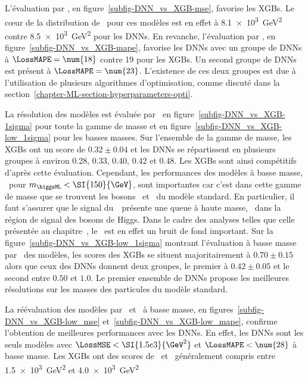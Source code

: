 L'évaluation par \LossMSE, en figure~\ref{subfig-DNN_vs_XGB-mse}, favorise les XGBs.
Le cœur de la distribution de \LossMSE\ pour ces modèles est en effet à \SI{8.1e3}{\GeV^2}
contre \SI{8.5e3}{\GeV^2} pour les DNNs.
En revanche,
l'évaluation par \LossMAPE, en figure~\ref{subfig-DNN_vs_XGB-mape}, favorise les DNNs
avec un groupe de DNNs à $\LossMAPE=\num{18}$
contre \num{19} pour les XGBs.
Un second groupe de DNNs est présent à $\LossMAPE=\num{23}$.
L'existence de ces deux groupes est due à l'utilisation de plusieurs algorithmes d'optimisation, comme discuté dans la section~\ref{chapter-ML-section-hyperparameters-opti}.
\par
La résolution des modèles est évaluée par \OneSigmaWidth\
en figure~\ref{subfig-DNN_vs_XGB-1sigma} pour toute la gamme de masse
et
en figure~\ref{subfig-DNN_vs_XGB-low_1sigma} pour les basses masses.
Sur l'ensemble de la gamme de masse,
les XGBs ont un score de $\num{0.32}\pm\num{0.04}$
et
les DNNs se répartissent en plusieurs groupes
à environ
\num{0.28}, \num{0.33}, \num{0.40}, \num{0.42} et \num{0.48}.
Les XGBs sont ainsi compétitifs d'après cette évaluation.
Cependant,
les performances des modèles
à basse masse, \ie\ pour $m_{\higgsML} < \SI{150}{\GeV}$,
sont importantes car c'est dans cette gamme de masse que se trouvent les bosons \Zboson\ et \higgs\ du modèle standard.
En particulier, il faut s'assurer que le signal du~\Zboson\ présente une queue à haute masse, \ie\ dans la région de signal des bosons de Higgs.
Dans le cadre des analyses telles que celle présentée au chapitre~\refChHTT, le \Zboson\ est en effet un bruit de fond important.
Sur la figure~\ref{subfig-DNN_vs_XGB-low_1sigma}
montrant l'évaluation à basse masse par \OneSigmaWidth\ des modèles,
les scores des XGBs se situent majoritairement à $\num{0.70}\pm\num{0.15}$
alors que ceux des DNNs donnent deux groupes,
le premier à $\num{0.42}\pm\num{0.05}$
et
le second entre $\num{0.50}$ et $\num{1.0}$.
Le premier ensemble de DNNs propose les meilleures résolutions sur les masses des particules du modèle standard.
\par
La réévaluation des modèles par 
\LossMSE\ et \LossMAPE\ à basse masse, en figures~\ref{subfig-DNN_vs_XGB-low_mse} et~\ref{subfig-DNN_vs_XGB-low_mape},
confirme l'obtention de meilleures performances avec les DNNs.
En effet,
les DNNs sont les seuls modèles avec
$\LossMSE < \SI{1.5e3}{\GeV^2}$
et
$\LossMAPE < \num{28}$
à basse masse.
Les XGBs ont des scores de \LossMSE\ et \LossMAPE\ généralement compris
entre \SI{1.5e3}{\GeV^2} et \SI{4.0e3}{\GeV^2}

